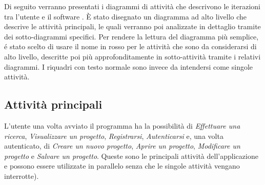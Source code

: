 Di seguito verranno presentati i diagrammi di attività che descrivono le iterazioni tra l'utente e il software \PROGETTO.
È stato disegnato un diagramma ad alto livello che descrive le attività principali, le quali verranno poi analizzate in dettaglio tramite dei sotto-diagrammi specifici. Per rendere la lettura del diagramma più semplice, é stato scelto di usare il nome in rosso per le attività che sono da considerarsi di alto livello, descritte poi più approfonditamente in sotto-attività tramite i relativi diagrammi. I riquadri con testo normale sono invece da intendersi come singole attività.

\subsection{Attività principali}
L'utente una volta avviato il programma ha la possibilità di \textit{Effettuare una ricerca}, \textit{Visualizzare un progetto}, \textit{Registrarsi}, \textit{Autenticarsi} e, una volta autenticato, di \textit{Creare un nuovo progetto}, \textit{Aprire un progetto}, \textit{Modificare un progetto} e \textit{Salvare un progetto}. Queste sono le principali attività dell'applicazione e possono essere utilizzate in parallelo senza che le singole attività vengano interrotte).

